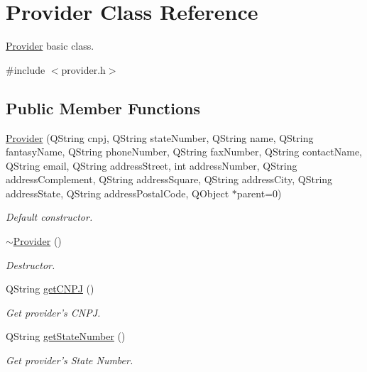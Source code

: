 \hypertarget{class_provider}{\section{\-Provider \-Class \-Reference}
\label{class_provider}
}


\hyperlink{class_provider}{\-Provider} basic class.  




{\ttfamily \#include $<$provider.\-h$>$}

\subsection*{\-Public \-Member \-Functions}
\begin{DoxyCompactItemize}
\item 
\hyperlink{class_provider_a02a60c211eec27f78b52c67e15b499c7}{\-Provider} (\-Q\-String cnpj, \-Q\-String state\-Number, \-Q\-String name, \-Q\-String fantasy\-Name, \-Q\-String phone\-Number, \-Q\-String fax\-Number, \-Q\-String contact\-Name, \-Q\-String email, \-Q\-String address\-Street, int address\-Number, \-Q\-String address\-Complement, \-Q\-String address\-Square, \-Q\-String address\-City, \-Q\-String address\-State, \-Q\-String address\-Postal\-Code, \-Q\-Object $\ast$parent=0)
\begin{DoxyCompactList}\small\item\em \-Default constructor. \end{DoxyCompactList}\item 
\hyperlink{class_provider_a8a5fe23233c869ae2b105beaa38dd648}{$\sim$\-Provider} ()
\begin{DoxyCompactList}\small\item\em \-Destructor. \end{DoxyCompactList}\item 
\-Q\-String \hyperlink{class_provider_adf4ad60029bbe6ccdf0c2e0eaa31d85d}{get\-C\-N\-P\-J} ()
\begin{DoxyCompactList}\small\item\em \-Get provider's \-C\-N\-P\-J. \end{DoxyCompactList}\item 
\-Q\-String \hyperlink{class_provider_ad8623280b06cc45445e7c55be5a8882f}{get\-State\-Number} ()
\begin{DoxyCompactList}\small\item\em \-Get provider's \-State \-Number. \end{DoxyCompactList}\item 

\end{DoxyCompactItemize}
